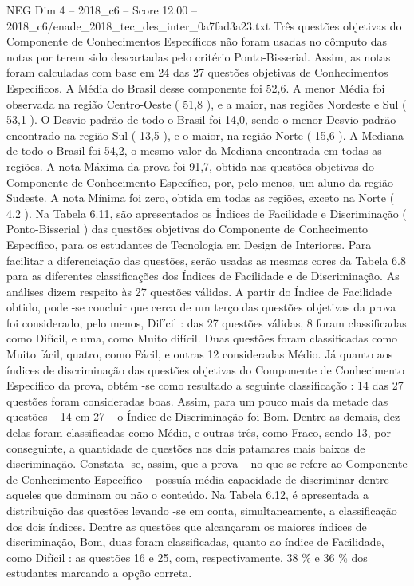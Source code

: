 \begin{textsample}{NEG Dim 4 – 2018\_c6 – Score 12.00 – 2018\_c6/enade\_2018\_tec\_des\_inter\_0a7fad3a23.txt}
Três questões objetivas do Componente de Conhecimentos Específicos não foram usadas no cômputo das notas por terem sido descartadas pelo critério Ponto-Bisserial.
Assim, as notas foram calculadas com base em 24 das 27 questões objetivas de Conhecimentos Específicos.
A Média do Brasil desse componente foi 52,6.
A menor Média foi observada na região Centro-Oeste ( 51,8 ), e a maior, nas regiões Nordeste e Sul ( 53,1 ).
O Desvio padrão de todo o Brasil foi 14,0, sendo o menor Desvio padrão encontrado na região Sul ( 13,5 ), e o maior, na região Norte ( 15,6 ).
A Mediana de todo o Brasil foi 54,2, o mesmo valor da Mediana encontrada em todas as regiões.
A nota Máxima da prova foi 91,7, obtida nas questões objetivas do Componente de Conhecimento Específico, por, pelo menos, um aluno da região Sudeste.
A nota Mínima foi zero, obtida em todas as regiões, exceto na Norte ( 4,2 ).
Na Tabela 6.11, são apresentados os Índices de Facilidade e Discriminação ( Ponto-Bisserial ) das questões objetivas do Componente de Conhecimento Específico, para os estudantes de Tecnologia em Design de Interiores.
Para facilitar a diferenciação das questões, serão usadas as mesmas cores da Tabela 6.8 para as diferentes classificações dos Índices de Facilidade e de Discriminação.
As análises dizem respeito às 27 questões válidas.
A partir do Índice de Facilidade obtido, pode -se concluir que cerca de um terço das questões objetivas da prova foi considerado, pelo menos, Difícil : das 27 questões válidas, 8 foram classificadas como Difícil, e uma, como Muito difícil.
Duas questões foram classificadas como Muito fácil, quatro, como Fácil, e outras 12 consideradas Médio.
Já quanto aos índices de discriminação das questões objetivas do Componente de Conhecimento Específico da prova, obtém -se como resultado a seguinte classificação : 14 das 27 questões foram consideradas boas.
Assim, para um pouco mais da metade das questões – 14 em 27 – o Índice de Discriminação foi Bom.
Dentre as demais, dez delas foram classificadas como Médio, e outras três, como Fraco, sendo 13, por conseguinte, a quantidade de questões nos dois patamares mais baixos de discriminação.
Constata -se, assim, que a prova – no que se refere ao Componente de Conhecimento Específico – possuía média capacidade de discriminar dentre aqueles que dominam ou não o conteúdo.
Na Tabela 6.12, é apresentada a distribuição das questões levando -se em conta, simultaneamente, a classificação dos dois índices.
Dentre as questões que alcançaram os maiores índices de discriminação, Bom, duas foram classificadas, quanto ao índice de Facilidade, como Difícil : as questões 16 e 25, com, respectivamente, 38 \% e 36 \% dos estudantes marcando a opção correta.

\end{textsample}
